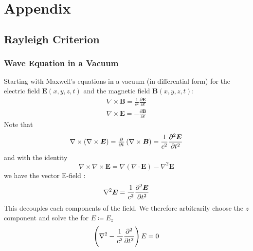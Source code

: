 %
%
%
%
%
\newcommand*{\E}{\bm{E}}
\newcommand*{\B}{\bm{B}}
\newcommand*{\rr}{\bm{r}}
\newcommand*{\Ef}{\textit{\textbf{E}} }

\section{Appendix}\label{sec:appendix}
\localtableofcontents

\subsection{Rayleigh Criterion}

\subsubsection{Wave Equation in a Vacuum}

Starting with Maxwell's equations in a vacuum (in differential form) for the electric field \(\E(x,y,z, t)\) and the magnetic field \(\B(x,y,z, t)\):
%
\begin{align}
    \nabla \times \B = \frac{1}{c^2} \frac{\partial \E}{\partial t} \\
    \nabla \times \E = - \frac{\partial \B}{\partial t}
\end{align}
%
Note that
%
\begin{equation}
    \nabla \times \left( \nabla \times \E \right) = \pd{}{t} \left( \nabla \times \B\right) = \frac{1}{c^2} \pdv[2]{\E}{t}
\end{equation}
%
and with the identity
\begin{equation}
    \nabla \times \nabla \times \E = \nabla (\nabla\cdot \E) - \nabla^2 \E
\end{equation}
%
we have the vector E-field :
%
\begin{equation}
    \nabla^2 \E = \frac{1}{c^2} \pdv[2]{\E}{t}
\end{equation}
%
This decouples each components of the  field. We therefore arbitrarily choose the \(z\) component and solve the  for \(E \coloneqq E_z\)
%
\begin{equation}
    \left(\nabla^2 - \frac{1}{c^2} \pdv[2]{}{t}\right) E = 0 \label{eqn:scalarwaveeqn}
\end{equation}
%

